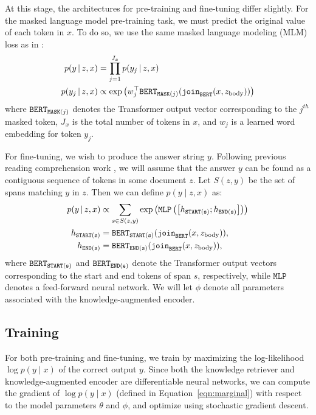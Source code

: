 \documentclass{article}
\begin{document}
At this stage, the architectures for pre-training and fine-tuning differ slightly. For the masked language model pre-training task, we must predict the original value of each \mask token in $x$. To do so, we use the same masked language modeling (MLM) loss as in \citet{bert}:
\begin{align*}
\centering
p(y\mid z,x) &= \prod_{j=1}^{J_x} p(y_j \mid z, x) \\
p(y_j \mid z, x) &\propto \exp \left(w_j^\top \bert_{\mathtt{MASK}(j)}(\joinbert(x, z_\text{body}))\right)
\end{align*}
where $\mathtt{BERT}_{\mathtt{MASK}(j)}$ denotes the Transformer output vector corresponding to the $j^{th}$ masked token, $J_x$ is the total number of \mask tokens in $x$, and $w_j$ is a learned word embedding for token $y_j$.

For \openqa fine-tuning, we wish to produce the answer string $y$. Following previous reading comprehension work \cite{squad,bidaf,rasor,bidaf_plusplus}, we will assume that the answer $y$ can be found as a contiguous sequence of tokens in some document $z$.
Let $S(z, y)$ be the set of spans matching $y$ in $z$. Then we can define $p(y \mid z,x)$ as:
\begin{align*}
p(y \,|\, z, x)  &\propto \sum_{s \in S(z, y)} \exp\left(\mathtt{MLP}\left(\left[h_{\mathtt{START(s)}} ; h_{\mathtt{END(s)}}\right]\right)\right)\\
h_{\mathtt{START(s)}} &= \mathtt{BERT_{START(s)}}(\mathtt{join}_\mathtt{BERT}(x, z_\text{body})), \\
h_{\mathtt{END(s)}} &= \mathtt{BERT_{END(s)}}(\mathtt{join}_\mathtt{BERT}(x, z_\text{body})),
\end{align*}
where $\mathtt{BERT_{START(s)}}$ and $\mathtt{BERT_{END(s)}}$ denote the Transformer output vectors corresponding to the start and end tokens of span $s$, respectively, while $\mathtt{MLP}$ denotes a feed-forward neural network. We will let $\phi$ denote all parameters associated with the knowledge-augmented encoder.

\subsection{Training}
\label{sec:training}

For both pre-training and fine-tuning, we train by maximizing the log-likelihood $\log p(y\mid x)$ of the correct output $y$. Since both the knowledge retriever and knowledge-augmented encoder are differentiable neural networks, we can compute the gradient of $\log p(y\mid x)$ (defined in Equation~\ref{eqn:marginal}) with respect to the model parameters $\theta$ and $\phi$, and optimize using stochastic gradient descent.
\end{document}
